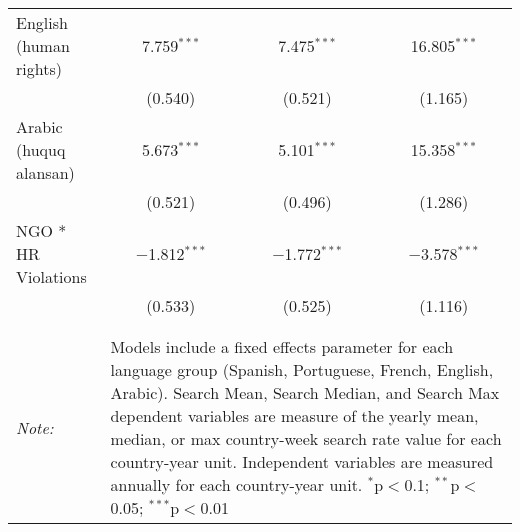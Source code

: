 \begin{table}[!htbp]
\begin{tabular}{@{\extracolsep{5pt}}lccc}
  English (human rights) & 7.759$^{***}$ & 7.475$^{***}$ & 16.805$^{***}$ \\ 
  & (0.540) & (0.521) & (1.165) \\ 
  Arabic (huquq alansan) & 5.673$^{***}$ & 5.101$^{***}$ & 15.358$^{***}$ \\ 
  & (0.521) & (0.496) & (1.286) \\ 
  NGO * HR Violations & $-$1.812$^{***}$ & $-$1.772$^{***}$ & $-$3.578$^{***}$ \\ 
  & (0.533) & (0.525) & (1.116) \\ 
 \hline \\[-1.8ex] 
\hline 
\hline \\[-1.8ex] 
\textit{Note:}  & \multicolumn{3}{l}{\parbox[t]{8cm}{Models include a fixed effects parameter for each language group (Spanish, Portuguese, French, English, Arabic). Search Mean, Search Median, and Search Max dependent variables are measure of the yearly mean, median, or max country-week search rate value for each country-year unit. Independent variables are measured annually for each country-year unit. $^{*}$p$<$0.1; $^{**}$p$<$0.05; $^{***}$p$<$0.01}} \\ 
\end{tabular} 
\end{table} 
